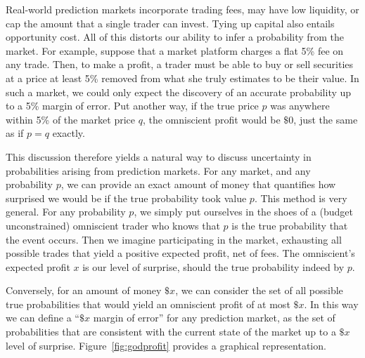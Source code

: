 \documentclass[sigconf,anonymous]{aamas}   %
\begin{document}
Real-world prediction markets incorporate trading fees, may have low liquidity, or cap the amount that a single trader can invest. Tying up capital also entails opportunity cost. All of this distorts our ability to infer a probability from the market. For example, suppose that a market platform charges a flat 5\% fee on any trade. Then, to make a profit, a trader must be able to buy or sell securities at a price at least 5\% removed from what she truly estimates to be their value. In such a market, we could only expect the discovery of an accurate probability up to a 5\% margin of error. Put another way, if the true price $p$ was anywhere within 5\% of the market price $q$, the omniscient profit would be $\$0$, just the same as if $p=q$ exactly.

This discussion therefore yields a natural way to discuss uncertainty in probabilities arising from prediction markets. For any market, and any probability $p$, we can provide an exact amount of money that quantifies how surprised we would be if the true probability took value $p$.
This method is very general. For any probability $p$, we simply put ourselves in the shoes of a (budget unconstrained) omniscient trader who knows that $p$ is the true probability that the event occurs. Then we imagine participating in the market, exhausting all possible trades that yield a positive expected profit, net of fees. 
The omniscient's expected profit $x$ is our level of surprise, should the true probability indeed by $p$.

Conversely, for an amount of money $\$x$, we can consider the set of all possible true probabilities that would yield an omniscient profit of at most $\$x$. In this way we can define a ``$\$x$ margin of error'' for any prediction market, as the set of probabilities that are consistent with the current state of the market up to a $\$x$ level of surprise. Figure~\ref{fig:godprofit} provides a graphical representation. 
\end{document}
